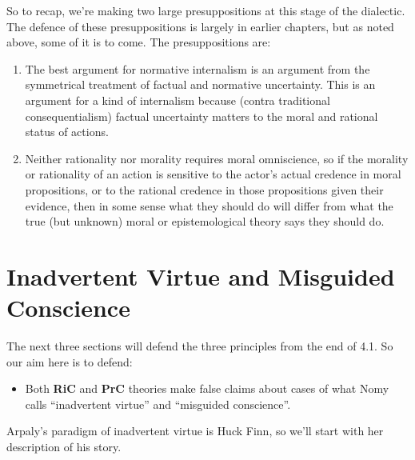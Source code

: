 So to recap, we're making two large presuppositions at this stage of the dialectic. The defence of these presuppositions is largely in earlier chapters, but as noted above, some of it is to come. The presuppositions are:

\begin{enumerate}
\item{} The best argument for normative internalism is an argument from the symmetrical treatment of factual and normative uncertainty. This is an argument for a kind of internalism because (contra traditional consequentialism) factual uncertainty matters to the moral and rational status of actions.

\item{} Neither rationality nor morality requires moral omniscience, so if the morality or rationality of an action is sensitive to the actor's actual credence in moral propositions, or to the rational credence in those propositions given their evidence, then in some sense what they should do will differ from what the true (but unknown) moral or epistemological theory says they should do.

\end{enumerate}
\section{Inadvertent Virtue and Misguided Conscience}
\label{inadvertentvirtueandmisguidedconscience}

The next three sections will defend the three principles from the end of 4.1. So our aim here is to defend:

\begin{itemize}
\item{} Both \textbf{RiC} and \textbf{PrC} theories make false claims about cases of what Nomy \citet[10]{Arpaly2003} calls ``inadvertent virtue'' and ``misguided conscience''.

\end{itemize}
Arpaly's paradigm of inadvertent virtue is \gls{Huck} Finn, so we'll start with her description of his story.

